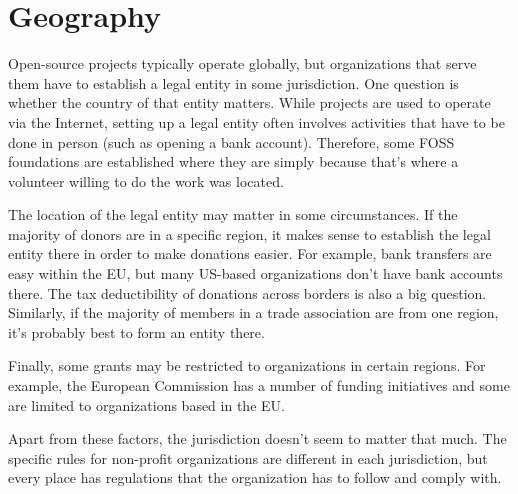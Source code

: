 


\chapter{Geography}

Open-source projects typically operate globally, but organizations that serve them have to establish a legal entity in some jurisdiction.  One question is whether the country of that entity matters.  While projects are used to operate via the Internet, setting up a legal entity often involves activities that have to be done in person (such as opening a bank account).  Therefore, some FOSS foundations are established where they are simply because that's where a volunteer willing to do the work was located.

The location of the legal entity may matter in some circumstances.  If the majority of donors are in a specific region, it makes sense to establish the legal entity there in order to make donations easier.  For example, bank transfers are easy within the EU, but many US-based organizations don't have bank accounts there.  The tax deductibility of donations across borders is also a big question.  Similarly, if the majority of members in a trade association are from one region, it's probably best to form an entity there.

Finally, some grants may be restricted to organizations in certain regions.  For example, the European Commission has a number of funding initiatives and some are limited to organizations based in the EU.

Apart from these factors, the jurisdiction doesn't seem to matter that much.  The specific rules for non-profit organizations are different in each jurisdiction, but every place has regulations that the organization has to follow and comply with.

